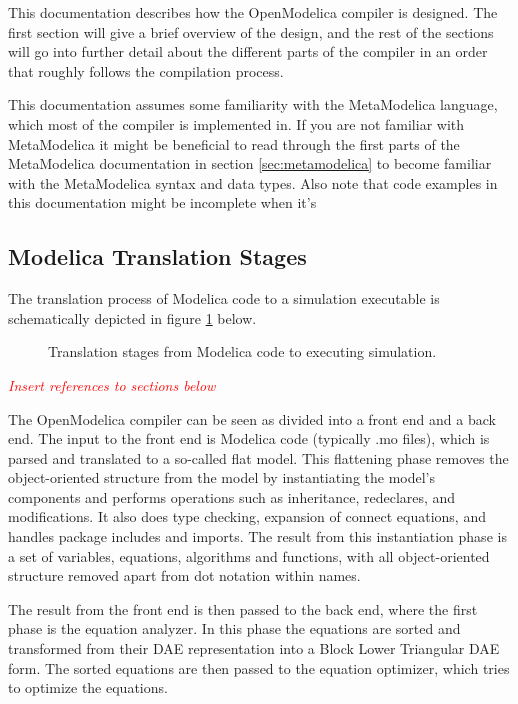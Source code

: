 This documentation describes how the OpenModelica compiler is designed. The
first section will give a brief overview of the design, and the rest of the
sections will go into further detail about the different parts of the compiler
in an order that roughly follows the compilation process. 

This documentation assumes some familiarity with the MetaModelica language,
which most of the compiler is implemented in. If you are not familiar with
MetaModelica it might be beneficial to read through the first parts of the
MetaModelica documentation in section \ref{sec:metamodelica} to become familiar
with the MetaModelica syntax and data types. Also note that code examples in
this documentation might be incomplete when it's 

\subsection{Modelica Translation Stages}
The translation process of Modelica code to a simulation executable is
schematically depicted in figure \ref{fig:process_overview} below. 
\begin{figure}[h!t]
\centering
{}
\caption{Translation stages from Modelica code to executing simulation.}
\label{fig:process_overview}
\end{figure}
\textcolor{red}{\em Insert references to sections below}

The OpenModelica compiler can be seen as divided into a front end and a back
end. The input to the front end is Modelica code (typically .mo files), which is
parsed and translated to a so-called flat model.  This flattening phase removes
the object-oriented structure from the model by instantiating the model's
components and performs operations such as inheritance, redeclares, and
modifications.  It also does type checking, expansion of connect equations, and
handles package includes and imports. The result from this instantiation phase
is a set of variables, equations, algorithms and functions, with all
object-oriented structure removed apart from dot notation within names.

The result from the front end is then passed to the back end, where the first
phase is the equation analyzer. In this phase the equations are sorted and
transformed from their DAE representation into a Block Lower Triangular DAE
form. The sorted equations are then passed to the equation optimizer, which
tries to optimize the equations.

